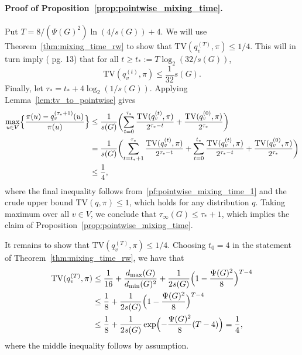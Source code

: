 \paragraph{Proof of Proposition~\ref{prop:pointwise_mixing_time}.}
	Put $T = 8/(\Psi(G)^2) \ln(4/s(G)) + 4$. We will use Theorem~\ref{thm:mixing_time_rw} to show that $\mathrm{TV}(q_v^{(T)},\pi) \leq 1/4$. This will in turn imply (\cite{montenegro2002} pg. 13) that for all $t \geq t_{\ast} := T \log_2(32/s(G))$,
	\begin{equation}
	\label{pf:pointwise_mixing_time_1}
	\mathrm{TV}(q_v^{(t)},\pi) \leq \frac{1}{32}s(G).
	\end{equation}
	Finally, let $\tau_{\ast} = t_{\ast} + 4\log_2(1/s(G))$. Applying Lemma~\ref{lem:tv_to_pointwise} gives
	\begin{align*}
	\max_{u \in V} \Bigl\{\frac{\pi(u) - q_v^{(\tau_{\ast} + 1)}(u)}{\pi(u)}\Bigr\} & \leq \frac{1}{s(G)}\biggl(\sum_{t = 0}^{\tau_{\ast}} \frac{\mathrm{TV}(q_v^{(t)}, \pi)}{2^{\tau_{\ast} - t}} + \frac{\mathrm{TV}(q_v^{(0)}, \pi)}{2^{\tau_{\ast}}}\biggr) \\
	& = \frac{1}{s(G)}\biggl(\sum_{t = t_{\ast} + 1}^{\tau_{\ast}} \frac{\mathrm{TV}(q_v^{(t)}, \pi)}{2^{\tau_{\ast} - t}} + \sum_{t = 0}^{t_{\ast}} \frac{\mathrm{TV}(q_v^{(t)}, \pi)}{2^{\tau_{\ast} - t}} + \frac{\mathrm{TV}(q_v^{(0)}, \pi)}{2^{\tau_{\ast}}}\biggr) \\
	& \leq \frac{1}{4},
	\end{align*}
	where the final inequality follows from~\eqref{pf:pointwise_mixing_time_1} and the crude upper bound $\mathrm{TV}(q,\pi) \leq 1$, which holds for any distribution $q$. Taking maximum over all $v \in V$, we conclude that $\tau_{\infty}(G) \leq \tau_{\ast} + 1$, which implies the claim of Proposition~\ref{prop:pointwise_mixing_time}.
	
	It remains to show that $\mathrm{TV}(q_v^{(T)},\pi) \leq 1/4$. Choosing $t_0 = 4$ in the statement of Theorem~\ref{thm:mixing_time_rw}, we have that
	\begin{align*}
	\mathrm{TV}(q_v^{(T)},\pi) & \leq \frac{1}{16} + \frac{d_{\max}(G)}{d_{\min}(G)^2} + \frac{1}{2s(G)} \Bigl(1 - \frac{\Psi(G)^2}{8}\Bigr)^{T - 4} \\
	& \leq \frac{1}{8} + \frac{1}{2s(G)} \Bigl(1 - \frac{\Psi(G)^2}{8}\Bigr)^{T - 4} \\
	& \leq \frac{1}{8} + \frac{1}{2s(G)} \exp\Bigl(-\frac{\Psi(G)^2}{8}(T - 4)\Bigr) = \frac{1}{4},
	\end{align*}
	where the middle inequality follows by assumption.

